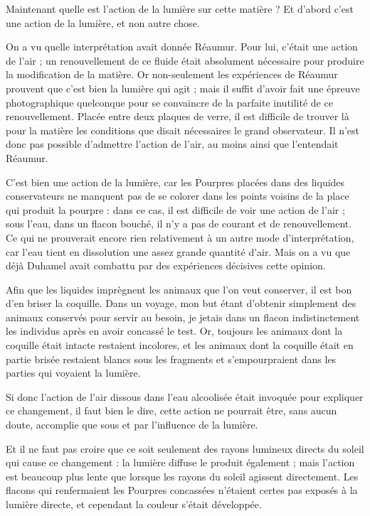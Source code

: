 \documentclass[a4paper, 11pt, oneside, polutonikogreek, french]{article}
\begin{document}
Maintenant quelle est l'action de la lumière sur cette matière ? Et d'abord c'est une action de la lumière, et non autre chose.

On a vu quelle interprétation avait donnée Réaumur. Pour lui, c'était une action de l'air ; un renouvellement de ce fluide était absolument nécessaire pour produire la modification de la matière. Or non-seulement les expériences de Réaumur prouvent que c'est bien la lumière qui agit ; mais il suffit d'avoir fait une épreuve photographique quelconque pour se convaincre de la parfaite inutilité de ce renouvellement. Placée entre deux plaques de verre, il est difficile de trouver là pour la matière les conditions que disait nécessaires le grand observateur. Il n'est donc pas possible d'admettre l'action de l'air, au moins ainsi que l'entendait Réaumur.

C'est bien une action de la lumière, car les Pourpres placées dans des liquides conservateurs ne manquent pas de se colorer dans les points voisins de la place qui produit la pourpre : dans ce cas, il est difficile de voir une action de l'air ; sous l'eau, dans un flacon bouché, il n'y a pas de courant et de renouvellement. Ce qui ne prouverait encore rien relativement à un autre mode d'interprétation, car l'eau tient en dissolution une assez grande quantité d'air. Mais on a vu que déjà Duhamel avait combattu par des expériences décisives cette opinion.

Afin que les liquides imprègnent les animaux que l'on veut conserver, il est bon d'en briser la coquille. Dans un voyage, mon but étant d'obtenir simplement des animaux conservés pour servir au besoin, je jetais dans un flacon indistinctement les individus après en avoir concassé le test. Or, toujours les animaux dont la coquille était intacte restaient incolores, et les animaux dont la coquille était en partie brisée restaient blancs sous les fragments et s'empourpraient dans les parties qui voyaient la lumière.

Si donc l'action de l'air dissous dans l'eau alcoolisée était invoquée pour expliquer ce changement, il faut bien le dire, cette action ne pourrait être, sans aucun doute, accomplie que sous et par l'influence de la lumière.

Et il ne faut pas croire que ce soit seulement des rayons lumineux directs du soleil qui cause ce changement : la lumière diffuse le produit également ; mais l'action est beaucoup plus lente que lorsque les rayons du soleil agissent directement. Les flacons qui renfermaient les Pourpres concassées n'étaient certes pas exposés à la lumière directe, et cependant la couleur s'était développée.
\end{document}
